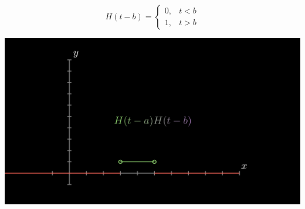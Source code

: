 \documentclass[11pt]{article}
\theoremstyle{definition}
\begin{document}
\[   
    H(t- b) = 
     \begin{cases}
    0, & \text{$t < b$} \\ 
    1, & \text{$t > b$}
     \end{cases}
\]

\begin{center}
\includegraphics[scale=0.15]{Test3.png}
\end{center}
\end{document}
